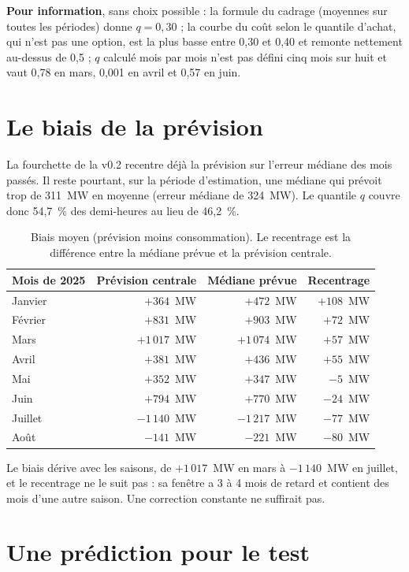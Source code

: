 \documentclass[11pt,a4paper]{article}
\begin{document}
\textbf{Pour information}, sans choix possible : la formule du cadrage (moyennes sur toutes les périodes) donne $q = 0{,}30$ ; la courbe du coût selon le quantile d'achat, qui n'est pas une option, est la plus basse entre 0,30 et 0,40 et remonte nettement au-dessus de 0,5 ; $q$ calculé mois par mois n'est pas défini cinq mois sur huit et vaut 0,78 en mars, 0,001 en avril et 0,57 en juin.

\section{Le biais de la prévision}

La fourchette de la v0.2 recentre déjà la prévision sur l'erreur médiane des mois passés. Il reste pourtant, sur la période d'estimation, une médiane qui prévoit trop de 311~MW en moyenne (erreur médiane de 324~MW). Le quantile $q$ couvre donc 54,7~\% des demi-heures au lieu de 46,2~\%.

\begin{table}[H]
\small
\begin{tabularx}{\linewidth}{Yrrr}
\toprule
\textbf{Mois de 2025} & \textbf{Prévision centrale} & \textbf{Médiane prévue} & \textbf{Recentrage} \\
\midrule
Janvier & $+364$~MW & $+472$~MW & $+108$~MW \\
Février & $+831$~MW & $+903$~MW & $+72$~MW \\
Mars & $+1\,017$~MW & $+1\,074$~MW & $+57$~MW \\
Avril & $+381$~MW & $+436$~MW & $+55$~MW \\
Mai & $+352$~MW & $+347$~MW & $-5$~MW \\
Juin & $+794$~MW & $+770$~MW & $-24$~MW \\
Juillet & $-1\,140$~MW & $-1\,217$~MW & $-77$~MW \\
Août & $-141$~MW & $-221$~MW & $-80$~MW \\
\bottomrule
\end{tabularx}
\caption{Biais moyen (prévision moins consommation). Le recentrage est la différence entre la médiane prévue et la prévision centrale.}
\end{table}

Le biais dérive avec les saisons, de $+1\,017$~MW en mars à $-1\,140$~MW en juillet, et le recentrage ne le suit pas : sa fenêtre a 3 à 4 mois de retard et contient des mois d'une autre saison. Une correction constante ne suffirait pas.

\section{Une prédiction pour le test}
\end{document}
